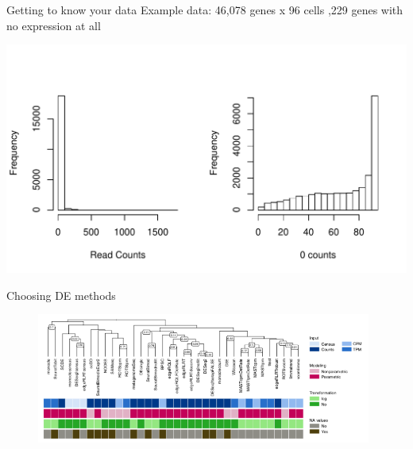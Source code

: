 \documentclass{beamer}\usepackage[]{graphicx}\usepackage[]{color}
\makeatletter
\def\maxwidth{ %
  \ifdim\Gin@nat@width>\linewidth
    \linewidth
  \else
    \Gin@nat@width
  \fi
}
\newenvironment{knitrout}{}{} %
\makeatother
\begin{document}
\begin{frame}
\begin{block}{Getting to know your data}
\scriptsize
Example data: 46,078 genes x 96 cells ,229 genes with no expression at all

\begin{knitrout}
\color{fgcolor}
\includegraphics[width=\maxwidth]{figure/knowdata-1} 

\end{knitrout}
\end{block}
\end{frame}


\begin{frame}
\begin{block}{Choosing DE methods}
\vspace{0.7cm}
\begin{center}
\begin{figure}
\includegraphics[width=11cm]{Images/Robinson-2018-hcl}
\caption{\cite{Soneson2018}}
\end{figure}
\end{center}
\end{block}
\end{frame}
\end{document}
